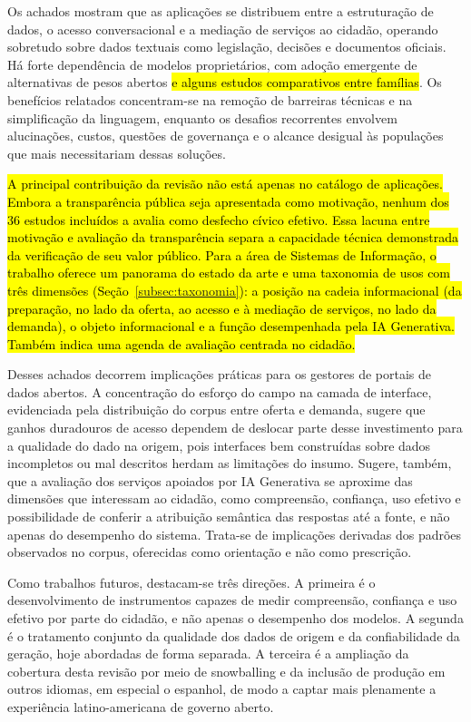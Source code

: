 \documentclass[brazilian]{sbc2025}
\newif\ifhl \hltrue
\newcommand{\rev}[1]{\ifhl\sethlcolor{yellow}\hl{#1}\else#1\fi}
\begin{document}
Os achados mostram que as aplicações se distribuem entre a estruturação de dados, o acesso conversacional e a mediação de serviços ao cidadão, operando sobretudo sobre dados textuais como legislação, decisões e documentos oficiais. Há forte dependência de modelos proprietários, com adoção emergente de alternativas de pesos abertos \rev{e alguns estudos comparativos entre famílias}. Os benefícios relatados concentram-se na remoção de barreiras técnicas e na simplificação da linguagem, enquanto os desafios recorrentes envolvem alucinações, custos, questões de governança e o alcance desigual às populações que mais necessitariam dessas soluções.

\rev{A principal contribuição da revisão não está apenas no catálogo de aplicações. Embora a transparência pública seja apresentada como motivação, nenhum dos 36 estudos incluídos a avalia como desfecho cívico efetivo. Essa lacuna entre motivação e avaliação da transparência separa a capacidade técnica demonstrada da verificação de seu valor público. Para a área de Sistemas de Informação, o trabalho oferece um panorama do estado da arte e uma taxonomia de usos com três dimensões (Seção~\mbox{\ref{subsec:taxonomia}}): a posição na cadeia informacional (da preparação, no lado da oferta, ao acesso e à mediação de serviços, no lado da demanda), o objeto informacional e a função desempenhada pela IA Generativa. Também indica uma agenda de avaliação centrada no cidadão.}

Desses achados decorrem implicações práticas para os gestores de portais de dados abertos. A concentração do esforço do campo na camada de interface, evidenciada pela distribuição do corpus entre oferta e demanda, sugere que ganhos duradouros de acesso dependem de deslocar parte desse investimento para a qualidade do dado na origem, pois interfaces bem construídas sobre dados incompletos ou mal descritos herdam as limitações do insumo. Sugere, também, que a avaliação dos serviços apoiados por IA Generativa se aproxime das dimensões que interessam ao cidadão, como compreensão, confiança, uso efetivo e possibilidade de conferir a atribuição semântica das respostas até a fonte, e não apenas do desempenho do sistema. Trata-se de implicações derivadas dos padrões observados no corpus, oferecidas como orientação e não como prescrição.

Como trabalhos futuros, destacam-se três direções. A primeira é o desenvolvimento de instrumentos capazes de medir compreensão, confiança e uso efetivo por parte do cidadão, e não apenas o desempenho dos modelos. A segunda é o tratamento conjunto da qualidade dos dados de origem e da confiabilidade da geração, hoje abordadas de forma separada. A terceira é a ampliação da cobertura desta revisão por meio de snowballing e da inclusão de produção em outros idiomas, em especial o espanhol, de modo a captar mais plenamente a experiência latino-americana de governo aberto.
\end{document}
